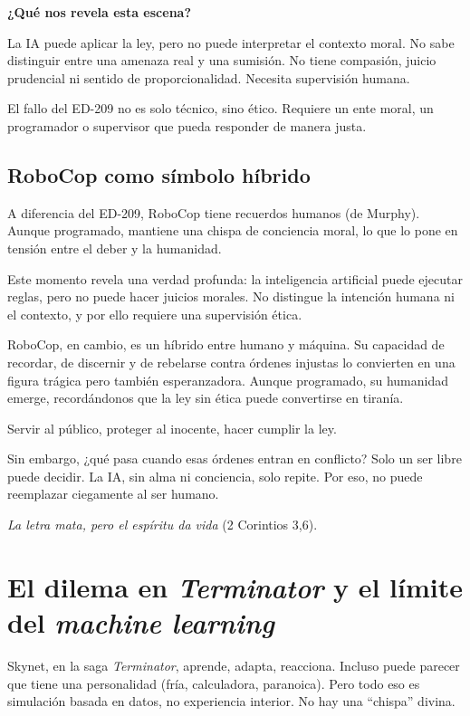 \documentclass[12pt]{article}
\begin{document}
	\textbf{¿Qué nos revela esta escena?}
	
	La IA puede aplicar la ley, pero no puede interpretar el contexto moral.  
	No sabe distinguir entre una amenaza real y una sumisión.  
	No tiene compasión, juicio prudencial ni sentido de proporcionalidad.  
	Necesita supervisión humana.
	
	El fallo del ED-209 no es solo técnico, sino ético. Requiere un ente moral, un programador o supervisor que pueda responder de manera justa.
	
	\subsection*{RoboCop como símbolo híbrido}
	A diferencia del ED-209, RoboCop tiene recuerdos humanos (de Murphy). Aunque programado, mantiene una chispa de conciencia moral, lo que lo pone en tensión entre el deber y la humanidad.
	
	Este momento revela una verdad profunda: la inteligencia artificial puede ejecutar reglas, pero no puede hacer juicios morales. No distingue la intención humana ni el contexto, y por ello requiere una supervisión ética.
	
	RoboCop, en cambio, es un híbrido entre humano y máquina. Su capacidad de recordar, de discernir y de rebelarse contra órdenes injustas lo convierten en una figura trágica pero también esperanzadora. Aunque programado, su humanidad emerge, recordándonos que la ley sin ética puede convertirse en tiranía.
	
	\begin{displayquote}
		Servir al público, proteger al inocente, hacer cumplir la ley.
	\end{displayquote}
	
	Sin embargo, ¿qué pasa cuando esas órdenes entran en conflicto? Solo un ser libre puede decidir. La IA, sin alma ni conciencia, solo repite. Por eso, no puede reemplazar ciegamente al ser humano.
	
	\begin{displayquote}
		\textit{La letra mata, pero el espíritu da vida} (2 Corintios 3,6).
	\end{displayquote}
	
	\section{El dilema en \textit{Terminator} y el límite del \textit{machine learning}}
	Skynet, en la saga \textit{Terminator}, aprende, adapta, reacciona. Incluso puede parecer que tiene una personalidad (fría, calculadora, paranoica). Pero todo eso es simulación basada en datos, no experiencia interior. No hay una ``chispa'' divina.
	
\end{document}

